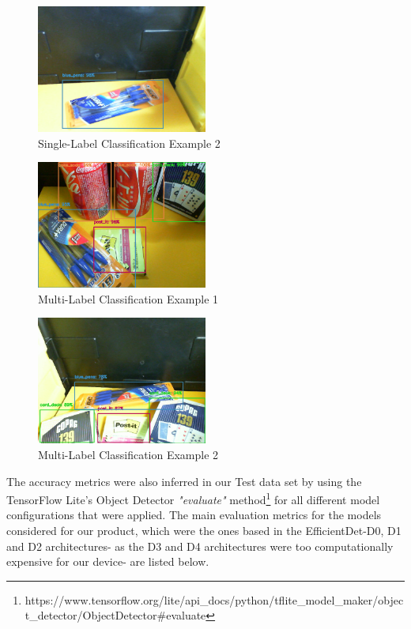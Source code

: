 \documentclass[openright]{normas-utf-tex} %
\begin{document}
\begin{figure}[H]
	\centering
	\includegraphics[width=0.5\textwidth]{./images/singlelabel-classification-2.png}
	\caption[Single-Label Classification Example 2]{Single-Label Classification Example 2}
\end{figure}

\begin{figure}[H]
	\centering
	\includegraphics[width=0.5\textwidth]{./images/multilabel-classification-1.png}
	\caption[Multi-Label Classification Example 1]{Multi-Label Classification Example 1}
\end{figure}

\begin{figure}[H]
	\centering
	\includegraphics[width=0.5\textwidth]{./images/multilabel-classification-2.png}
	\caption[Multi-Label Classification Example 2]{Multi-Label Classification Example 2}
\end{figure}

The accuracy metrics were also inferred in our Test data set by using the TensorFlow Lite's 
Object Detector \textit{"evaluate"} method\footnote{https://www.tensorflow.org/lite/api\_docs/python/tflite\_model\_maker/object\_detector/ObjectDetector\#evaluate}
for all different model configurations that were applied. 
The main evaluation metrics for the models considered for our product, which were the ones based 
in the EfficientDet-D0, D1 and D2 architectures- as the D3 and D4 architectures were too 
computationally expensive for our device- are listed below. 
\end{document}

